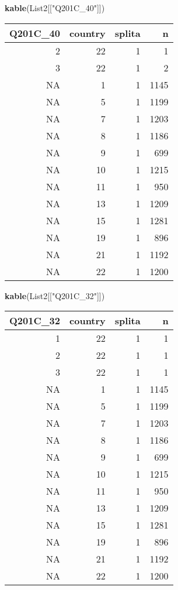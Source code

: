 \documentclass[]{article}
\newenvironment{Shaded}{\begin{snugshade}}{\end{snugshade}}
\newcommand{\KeywordTok}[1]{\textcolor[rgb]{0.13,0.29,0.53}{\textbf{#1}}}
\newcommand{\NormalTok}[1]{#1}
\newcommand{\StringTok}[1]{\textcolor[rgb]{0.31,0.60,0.02}{#1}}
\begin{document}
\begin{Shaded}
\begin{Highlighting}[]
\KeywordTok{kable}\NormalTok{(List2[[}\StringTok{"Q201C_40"}\NormalTok{]])}
\end{Highlighting}
\end{Shaded}

\begin{tabular}{r|r|r|r}
\hline
Q201C\_40 & country & splita & n\\
\hline
2 & 22 & 1 & 1\\
\hline
3 & 22 & 1 & 2\\
\hline
NA & 1 & 1 & 1145\\
\hline
NA & 5 & 1 & 1199\\
\hline
NA & 7 & 1 & 1203\\
\hline
NA & 8 & 1 & 1186\\
\hline
NA & 9 & 1 & 699\\
\hline
NA & 10 & 1 & 1215\\
\hline
NA & 11 & 1 & 950\\
\hline
NA & 13 & 1 & 1209\\
\hline
NA & 15 & 1 & 1281\\
\hline
NA & 19 & 1 & 896\\
\hline
NA & 21 & 1 & 1192\\
\hline
NA & 22 & 1 & 1200\\
\hline
\end{tabular}

\begin{Shaded}
\begin{Highlighting}[]
\KeywordTok{kable}\NormalTok{(List2[[}\StringTok{"Q201C_32"}\NormalTok{]])}
\end{Highlighting}
\end{Shaded}

\begin{tabular}{r|r|r|r}
\hline
Q201C\_32 & country & splita & n\\
\hline
1 & 22 & 1 & 1\\
\hline
2 & 22 & 1 & 1\\
\hline
3 & 22 & 1 & 1\\
\hline
NA & 1 & 1 & 1145\\
\hline
NA & 5 & 1 & 1199\\
\hline
NA & 7 & 1 & 1203\\
\hline
NA & 8 & 1 & 1186\\
\hline
NA & 9 & 1 & 699\\
\hline
NA & 10 & 1 & 1215\\
\hline
NA & 11 & 1 & 950\\
\hline
NA & 13 & 1 & 1209\\
\hline
NA & 15 & 1 & 1281\\
\hline
NA & 19 & 1 & 896\\
\hline
NA & 21 & 1 & 1192\\
\hline
NA & 22 & 1 & 1200\\
\hline
\end{tabular}
\end{document}
